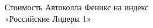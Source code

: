 \documentclass[aspectratio=169]{beamer}
\begin{document}
 \begin{frame}{Стоимость Автоколла Феникс на индекс \\ «Российские Лидеры 1»}
\begin{figure}[h!]
\begin{minipage}[h!]{0.49\linewidth}
\end{minipage}
\hfill
\begin{minipage}[h!]{0.49\linewidth}
\end{minipage}

\label{ris:image1}
\end{figure}
 \end{frame} 

 
\end{document}

